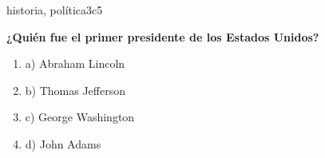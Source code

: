 \documentclass{article}
\begin{document}
\begin{question}{10}{historia, política}{3}{c}{5}{
\textbf{¿Quién fue el primer presidente de los Estados Unidos?}\\

\begin{enumerate}
    \item a) Abraham Lincoln
    \item b) Thomas Jefferson
    \item c) George Washington
    \item d) John Adams
\end{enumerate}
}
\end{question}
\end{document}
